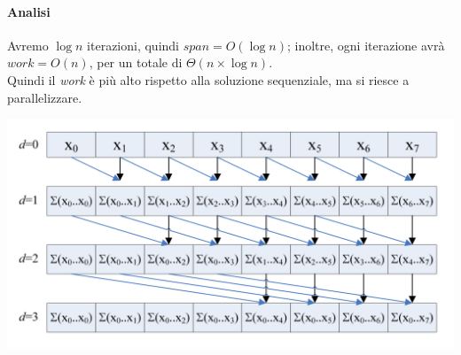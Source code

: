\paragraph{Analisi}
Avremo $\log{n}$ iterazioni, quindi $span = O(\log{n})$; inoltre, ogni iterazione avrà $work = O(n)$, per un totale di $\Theta(n\times \log{n})$. \\
Quindi il \textit{work} è più alto rispetto alla soluzione sequenziale, ma si riesce a parallelizzare.

\begin{center}
	\includegraphics[width=1\textwidth]{res/hillis_and_steele.png} \hfill
\end{center}

